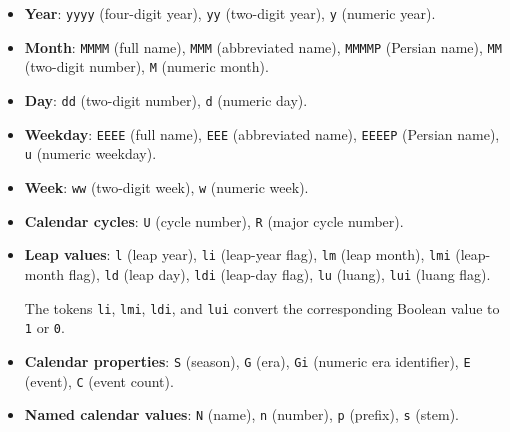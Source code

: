 \documentclass[10pt]{article}
\begin{document}
\begin{itemize}

    \item \textbf{Year}:
          \texttt{yyyy} (four-digit year),
          \texttt{yy} (two-digit year),
          \texttt{y} (numeric year).

    \item \textbf{Month}:
          \texttt{MMMM} (full name),
          \texttt{MMM} (abbreviated name),
          \texttt{MMMMP} (Persian name),
          \texttt{MM} (two-digit number),
          \texttt{M} (numeric month).

    \item \textbf{Day}:
          \texttt{dd} (two-digit number),
          \texttt{d} (numeric day).

    \item \textbf{Weekday}:
          \texttt{EEEE} (full name),
          \texttt{EEE} (abbreviated name),
          \texttt{EEEEP} (Persian name),
          \texttt{u} (numeric weekday).

    \item \textbf{Week}:
          \texttt{ww} (two-digit week),
          \texttt{w} (numeric week).

    \item \textbf{Calendar cycles}:
          \texttt{U} (cycle number),
          \texttt{R} (major cycle number).

    \item \textbf{Leap values}:
          \texttt{l} (leap year),
          \texttt{li} (leap-year flag),
          \texttt{lm} (leap month),
          \texttt{lmi} (leap-month flag),
          \texttt{ld} (leap day),
          \texttt{ldi} (leap-day flag),
          \texttt{lu} (luang),
          \texttt{lui} (luang flag).

          The tokens \texttt{li}, \texttt{lmi}, \texttt{ldi}, and
          \texttt{lui} convert the corresponding Boolean value to
          \texttt{1} or \texttt{0}.

    \item \textbf{Calendar properties}:
          \texttt{S} (season),
          \texttt{G} (era),
          \texttt{Gi} (numeric era identifier),
          \texttt{E} (event),
          \texttt{C} (event count).

    \item \textbf{Named calendar values}:
          \texttt{N} (name),
          \texttt{n} (number),
          \texttt{p} (prefix),
          \texttt{s} (stem).


\end{itemize}
\end{document}

